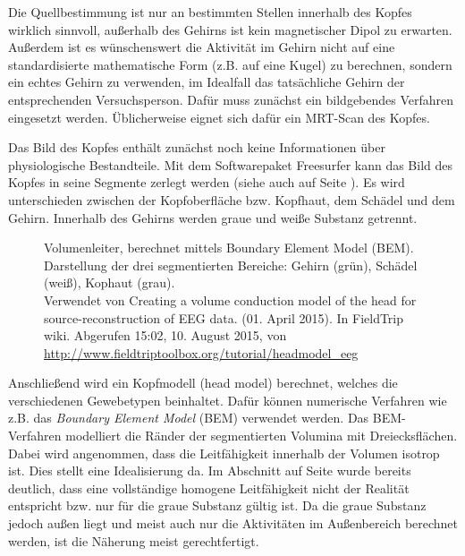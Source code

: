 \documentclass[doc,a4paper,12pt]{apa6}
\makeatletter
\DeclareRobustCommand*{\nameref}[1]{%
      \glqq{\myorg@nameref{#1}}\grqq%
    }%
\makeatother
\begin{document}
Die Quellbestimmung ist nur an bestimmten Stellen innerhalb des Kopfes wirklich sinnvoll, außerhalb des Gehirns ist kein magnetischer Dipol zu erwarten. Außerdem ist es wünschenswert die Aktivität im Gehirn nicht auf eine standardisierte mathematische Form (z.B. auf eine Kugel) zu berechnen, sondern ein echtes Gehirn zu verwenden, im Idealfall das tatsächliche Gehirn der entsprechenden Versuchsperson. Dafür muss zunächst ein bildgebendes Verfahren eingesetzt werden. Üblicherweise eignet sich dafür ein MRT-Scan des Kopfes.

Das Bild des Kopfes enthält zunächst noch keine Informationen über physiologische Bestandteile. Mit dem Softwarepaket Freesurfer kann das Bild des Kopfes in seine Segmente zerlegt werden (siehe auch \nameref{sec:head-struct} auf Seite \pageref{sec:head-struct}). Es wird unterschieden zwischen der Kopfoberfläche bzw. Kopfhaut, dem Schädel und dem Gehirn. Innerhalb des Gehirns werden graue und weiße Substanz getrennt.

\begin{figure}[t]
  \centering
  \vspace*{3mm}
  \caption[Volumenleiter, berechnet mittels Boundary Element Model (BEM)]{Volumenleiter, berechnet mittels Boundary Element Model (BEM). Darstellung der drei segmentierten Bereiche: Gehirn (grün), Schädel (weiß), Kophaut (grau).\\ Verwendet von \glqq Creating a volume conduction model of the head for source-reconstruction of EEG data\grqq . (01. April 2015). In FieldTrip wiki. Abgerufen 15:02, 10. August 2015, von \url{http://www.fieldtriptoolbox.org/tutorial/headmodel_eeg}}
  \label{img:bem}
\end{figure}

Anschließend wird ein Kopfmodell (head model) berechnet, welches die verschiedenen Gewebetypen beinhaltet. Dafür können numerische Verfahren wie z.B. das \emph{Boundary Element Model} (BEM) verwendet werden. Das BEM-Verfahren modelliert die Ränder der segmentierten Volumina mit Dreiecksflächen. Dabei wird angenommen, dass die Leitfähigkeit innerhalb der Volumen isotrop ist. Dies stellt eine Idealisierung da. Im Abschnitt \nameref{sec:head-struct} auf Seite \pageref{sec:head-struct} wurde bereits deutlich, dass eine vollständige homogene Leitfähigkeit nicht der Realität entspricht bzw. nur für die graue Substanz gültig ist. Da die graue Substanz jedoch außen liegt und meist auch nur die Aktivitäten im Außenbereich berechnet werden, ist die Näherung meist gerechtfertigt.
\end{document}
